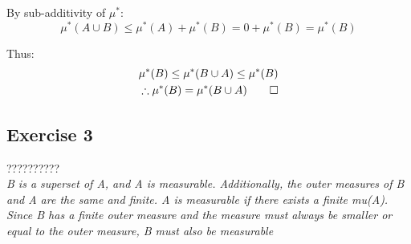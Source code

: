 \documentclass{article}
\begin{document}
By sub-additivity of $\mu^*$:
\[
    \mu^*(A \cup B) \leq \mu^*(A) + \mu^*(B) = 0 + \mu^*(B) = \mu^*(B)
\]

Thus:
\begin{align*}
    \mu^*(B) \leq \mu^*(B \cup A) \leq \mu^*(B) \\
    \therefore \mu^*(B) = \mu^*(B \cup A) \qed
\end{align*}

\subsection*{Exercise 3}
?????????? \\
\textit{B is a superset of A, and A is measurable. Additionally, the outer measures of B and A are the same and finite. A is measurable if there exists a finite mu(A). Since B has a finite outer measure and the measure must always be smaller or equal to the outer measure, B must also be measurable}
\end{document}
